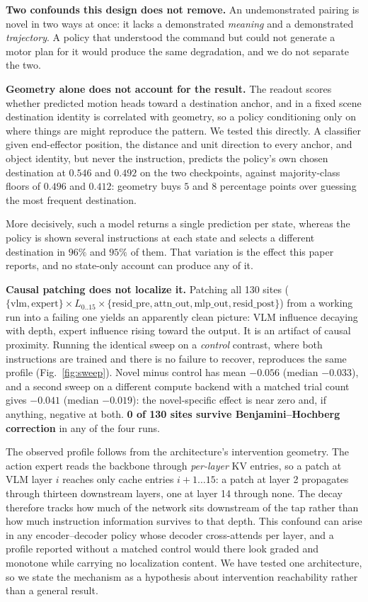 \documentclass{article}
\begin{document}
\textbf{Two confounds this design does not remove.} An undemonstrated pairing is novel in
two ways at once: it lacks a demonstrated \emph{meaning} and a demonstrated \emph{trajectory}.
A policy that understood the command but could not generate a motor plan for it would produce
the same degradation, and we do not separate the two.

\textbf{Geometry alone does not account for the result.} The readout scores whether
predicted motion heads toward a destination anchor, and in a fixed scene destination identity
is correlated with geometry, so a policy conditioning only on where things are might reproduce
the pattern. We tested this directly. A classifier given end-effector position, the distance
and unit direction to every anchor, and object identity, but never the instruction, predicts
the policy's own chosen destination at $0.546$ and $0.492$ on the two checkpoints, against
majority-class floors of $0.496$ and $0.412$: geometry buys $5$ and $8$ percentage points over
guessing the most frequent destination.

More decisively, such a model returns a single prediction per state, whereas the policy is
shown several instructions at each state and selects a different destination in $96\%$ and
$95\%$ of them. That variation is the effect this paper reports, and no state-only account can
produce any of it.

\textbf{Causal patching does not localize it.} Patching all 130 sites
($\{\textrm{vlm},\textrm{expert}\}\times L_{0..15}\times\{\textrm{resid\_pre},
\textrm{attn\_out},\textrm{mlp\_out},\textrm{resid\_post}\}$) from a working run into a failing
one yields an apparently clean picture: VLM influence decaying with depth, expert influence
rising toward the output. It is an artifact of causal proximity. Running the identical sweep on a
\emph{control} contrast, where both instructions are trained and there is no failure to
recover, reproduces the same
profile (Fig.~\ref{fig:sweep}). Novel minus control has mean $-0.056$ (median $-0.033$), and a
second sweep on a different compute backend with a matched trial count gives $-0.041$ (median
$-0.019$): the novel-specific effect is near zero and, if anything, negative at both. \textbf{0
of 130 sites survive Benjamini--Hochberg correction} in any of the four runs.

The observed profile follows from the architecture's intervention geometry. The action expert
reads the backbone through \emph{per-layer} KV entries, so a patch at VLM layer $i$ reaches
only cache entries $i{+}1 \ldots 15$: a patch at layer 2 propagates through thirteen downstream
layers, one at layer 14 through none. The decay therefore tracks how much of the network sits
downstream of the tap rather than how much instruction information survives to that depth. This
confound can arise in any encoder--decoder policy whose decoder cross-attends per layer, and a
profile reported without a matched control would there look graded and monotone while carrying
no localization content. We have tested one architecture, so we state the mechanism as a
hypothesis about intervention reachability rather than a general result.
\end{document}

